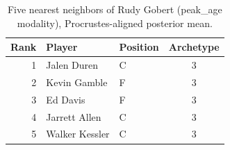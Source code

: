 \begin{table}[htbp]
  \centering\small
  \begin{tabular}{rllc}
    \toprule
    Rank & Player & Position & Archetype \\
    \midrule
    1 & Jalen Duren & C & 3 \\
    2 & Kevin Gamble & F & 3 \\
    3 & Ed Davis & F & 3 \\
    4 & Jarrett Allen & C & 3 \\
    5 & Walker Kessler & C & 3 \\
    \bottomrule
  \end{tabular}
  \caption{Five nearest neighbors of Rudy Gobert (peak_age modality), Procrustes-aligned posterior mean.}
  \label{tab:Rudy_Gobert_neighbors_peak_age}
\end{table}

